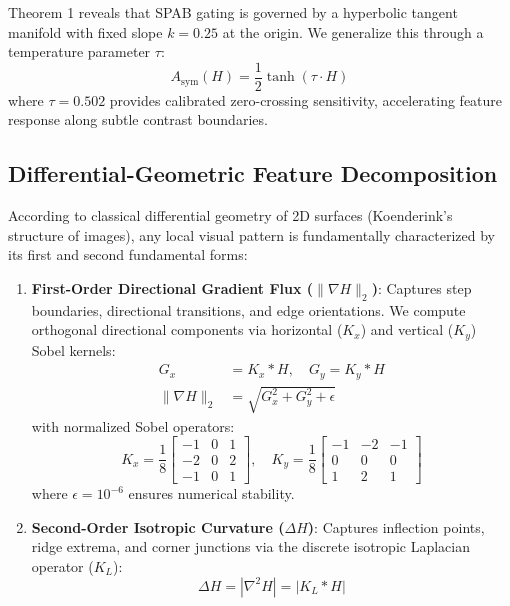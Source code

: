 \documentclass[conference]{IEEEtran}
\begin{document}
Theorem 1 reveals that SPAB gating is governed by a hyperbolic tangent manifold with fixed slope $k = 0.25$ at the origin. We generalize this through a temperature parameter $\tau$:
\begin{equation}
A_{\text{sym}}(H) = \frac{1}{2}\tanh(\tau \cdot H)
\label{eq:temp_sym}
\end{equation}
where $\tau = 0.502$ provides calibrated zero-crossing sensitivity, accelerating feature response along subtle contrast boundaries.

\subsection{Differential-Geometric Feature Decomposition}
According to classical differential geometry of 2D surfaces (Koenderink's structure of images), any local visual pattern is fundamentally characterized by its first and second fundamental forms:
\begin{enumerate}
    \item \textbf{First-Order Directional Gradient Flux ($\|\nabla H\|_2$)}: Captures step boundaries, directional transitions, and edge orientations. We compute orthogonal directional components via horizontal ($K_x$) and vertical ($K_y$) Sobel kernels:
    \begin{align}
    G_x &= K_x * H, \quad G_y = K_y * H \\
    \|\nabla H\|_2 &= \sqrt{G_x^2 + G_y^2 + \epsilon}
    \end{align}
    with normalized Sobel operators:
    \begin{equation}
    K_x = \frac{1}{8}\begin{bmatrix}-1&0&1\\-2&0&2\\-1&0&1\end{bmatrix}, \quad K_y = \frac{1}{8}\begin{bmatrix}-1&-2&-1\\0&0&0\\1&2&1\end{bmatrix}
    \end{equation}
    where $\epsilon = 10^{-6}$ ensures numerical stability.
    \item \textbf{Second-Order Isotropic Curvature ($\Delta H$)}: Captures inflection points, ridge extrema, and corner junctions via the discrete isotropic Laplacian operator ($K_L$):
    \begin{equation}
    \Delta H = |\nabla^2 H| = |K_L * H|
    \end{equation}
\end{enumerate}
\end{document}
